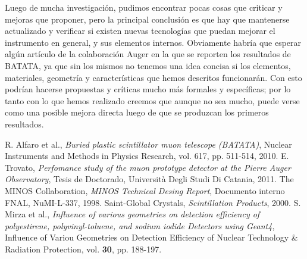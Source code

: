 \documentclass[a4paper,10pt]{article}
\numberwithin{equation}{section}
\begin{document}
\vspace{.3cm}

Luego de mucha investigación, pudimos encontrar pocas cosas que criticar y mejoras que 
proponer, pero la principal conclusión es que hay que mantenerse actualizado 
y verificar si existen nuevas tecnologías que puedan mejorar el instrumento en general, 
y sus elementos internos. Obviamente habría que esperar algún artículo de la colaboración 
Auger en la que se reporten los resultados de BATATA, ya que sin los mismos no tenemos 
una idea concisa si los elementos, materiales, geometría y características que 
hemos descritos funcionarán. Con esto podrían hacerse propuestas y críticas mucho 
más formales y específicas; por lo tanto con lo que hemos realizado creemos que aunque 
no sea mucho, puede verse como una posible mejora directa luego de que se produzcan 
los primeros resultados.

\newpage

\begin{thebibliography}{10}
 R. Alfaro et al., \emph{Buried plastic scintillator muon telescope (BATATA)}, 
 Nuclear Instruments and Methods in Physics Research, vol. 617, pp. 511-514, 2010.
 E. Trovato, \emph{Perfomance study of the muon prototype detector at the Pierre 
 Auger Observatory}, Tesis de Doctorado, Università Degli Studi Di Catania, 2011.
 The MINOS Collaboration, \emph{MINOS Technical Desing Report}, Documento interno 
 FNAL, NuMI-L-337, 1998. 
 Saint-Global Crystals, \emph{Scintillation Products}, 2000.
 S. Mirza et al., \emph{Influence of various geometries on detection efficiency of 
 polyestirene, polyvinyl-toluene, and sodium iodide Detectors using Geant4}, 
 Influence of Variou Geometries on Detection Efficiency of Nuclear Technology \& 
 Radiation Protection, vol. \textbf{30}, pp. 188-197.
\end{thebibliography}
\end{document}
